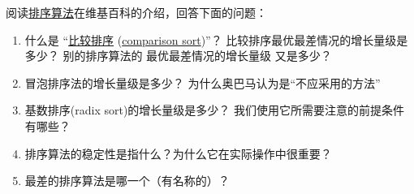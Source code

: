 \begin{exercise}


阅读\href{http://en.wikipedia.org/wiki/Sorting_algorithm}{排序算法}在维基百科的介绍，回答下面的问题：


\begin{enumerate}


\item 什么是 ``\href{https://zh.wikipedia.org/wiki/%E6%AF%94%E8%BE%83%E6%8E%92%E5%BA%8F}{比较排序} (\href{https://en.wikipedia.org/wiki/Comparison_sort}{comparison sort})''？  比较排序最优最差情况的增长量级是多少？  别的排序算法的 最优最差情况的增长量级 又是多少？


\item 冒泡排序法的增长量级是多少？ 为什么奥巴马认为是``不应采用的方法''


\item 基数排序(radix sort)的增长量级是多少？ 我们使用它所需要注意的前提条件有哪些？


\item 排序算法的稳定性是指什么？为什么它在实际操作中很重要？


\item 最差的排序算法是哪一个（有名称的）？



\end{enumerate}
\end{exercise}
